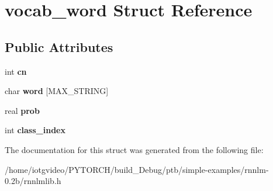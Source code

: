 \hypertarget{structvocab__word}{}\section{vocab\+\_\+word Struct Reference}
\label{structvocab__word}
\subsection*{Public Attributes}
\begin{DoxyCompactItemize}
\item 
\mbox{\label{structvocab__word_a6bdb56ef658d1e2170b054670059cbb2}} 
int {\bfseries cn}
\item 
\mbox{\label{structvocab__word_a069f94e6305a100329ca7db0c4cc6ecf}} 
char {\bfseries word} \mbox{[}M\+A\+X\+\_\+\+S\+T\+R\+I\+NG\mbox{]}
\item 
\mbox{\label{structvocab__word_a3bb8f4f7daa1a334b44f3035cc927483}} 
real {\bfseries prob}
\item 
\mbox{\label{structvocab__word_a8ce42b75c891143ce277e22bffea799c}} 
int {\bfseries class\+\_\+index}
\end{DoxyCompactItemize}


The documentation for this struct was generated from the following file\+:\begin{DoxyCompactItemize}
\item 
/home/iotgvideo/\+P\+Y\+T\+O\+R\+C\+H/build\+\_\+\+Debug/ptb/simple-\/examples/rnnlm-\/0.\+2b/rnnlmlib.\+h\end{DoxyCompactItemize}
